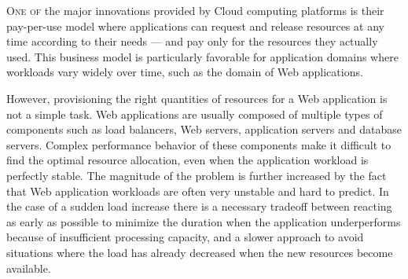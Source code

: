 


\lettrine{O}{ne of} the major innovations provided by Cloud computing
platforms is their pay-per-use model where applications can request
and release resources at any time according to their needs --- and pay
only for the resources they actually used. This business model is
particularly favorable for application domains where workloads vary
widely over time, such as the domain of Web applications.

However, provisioning the right quantities of resources for a Web
application is not a simple task. Web applications are usually
composed of multiple types of components such as load balancers, Web
servers, application servers and database servers. Complex performance
behavior of these components make it difficult to find the optimal
resource allocation, even when the application workload is perfectly
stable. The magnitude of the problem is further increased by the fact
that Web application workloads are often very unstable and hard to
predict. In the case of a sudden load increase there is a necessary
tradeoff between reacting as early as possible to minimize the
duration when the application underperforms because of insufficient
processing capacity, and a slower approach to avoid situations where
the load has already decreased when the new resources become
available.

